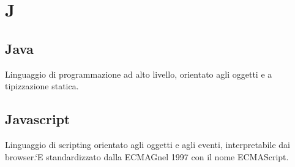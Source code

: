 \section*{J}
\markright{}
\subsection*{Java}
Linguaggio di programmazione ad alto livello, orientato agli oggetti e a tipizzazione statica.
\subsection*{Javascript}
Linguaggio di scripting orientato agli oggetti e agli eventi, interpretabile dai browser.`E standardizzato dalla ECMAGnel 1997 con il nome ECMAScript.